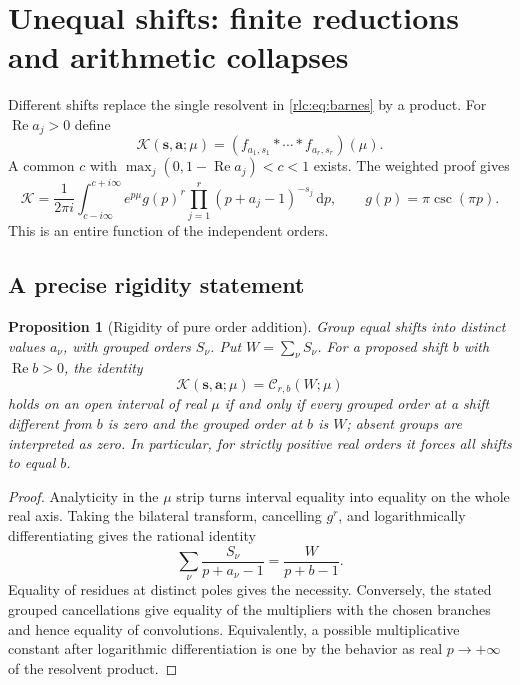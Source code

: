 \documentclass[11pt,a4paper]{article}
\numberwithin{equation}{section}
\newtheorem{proposition}[theorem]{Proposition}
\theoremstyle{definition}\newtheorem{definition}[theorem]{Definition}
\theoremstyle{remark}\newtheorem{remark}[theorem]{Remark}
\DeclareMathOperator{\Rea}{Re}
\newcommand{\dd}{\,\mathrm d}
\newcommand{\CC}{\mathcal C}
\begin{document}


\section{Unequal shifts: finite reductions and arithmetic collapses}
\label{rlc:sec:unequal}

Different shifts replace the single resolvent in
\eqref{rlc:eq:barnes} by a product. For $\Rea a_j>0$ define
\[
 \mathcal K(\boldsymbol s,\boldsymbol a;\mu)
       =(f_{a_1,s_1}*\cdots*f_{a_r,s_r})(\mu).
\]
A common $c$ with
$\max_j(0,1-\Rea a_j)<c<1$ exists. The weighted proof gives
\begin{equation}\label{rlc:eq:unequaltransform}
 \mathcal K=\frac1{2\pi i}\int_{c-i\infty}^{c+i\infty}
       e^{p\mu}g(p)^r\prod_{j=1}^r(p+a_j-1)^{-s_j}\dd p,
 \qquad g(p)=\pi\csc(\pi p).
\end{equation}
This is an entire function of the independent orders.

\subsection{A precise rigidity statement}
\begin{proposition}[Rigidity of pure order addition]
\label{rlc:prop:rigidity}
Group equal shifts into distinct values $a_\nu$, with grouped orders
$S_\nu$. Put $W=\sum_\nu S_\nu$. For a proposed shift $b$ with
$\Rea b>0$, the identity
\[
 \mathcal K(\boldsymbol s,\boldsymbol a;\mu)=\CC_{r,b}(W;\mu)
\]
holds on an open interval of real $\mu$ if and only if every grouped
order at a shift different from $b$ is zero and the grouped order at
$b$ is $W$; absent groups are interpreted as zero. In particular, for
strictly positive real orders it forces all shifts to equal $b$.
\end{proposition}
\begin{proof}
Analyticity in the $\mu$ strip turns interval equality into equality on
the whole real axis. Taking the bilateral transform, cancelling $g^r$,
and logarithmically differentiating gives the rational identity
\[
 \sum_\nu\frac{S_\nu}{p+a_\nu-1}=\frac{W}{p+b-1}.
\]
Equality of residues at distinct poles gives the necessity. Conversely,
the stated grouped cancellations give equality of the multipliers with
the chosen branches and hence equality of convolutions. Equivalently,
a possible multiplicative constant after logarithmic differentiation is
one by the behavior as real $p\to+\infty$ of the resolvent product.
\end{proof}
\end{document}
